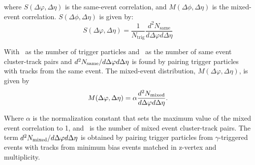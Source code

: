 
where $S(\Delta \varphi, \Delta \eta)$ is the same-event correlation, and $M(\Delta \phi, \Delta \eta)$ is the mixed-event correlation. $S(\Delta \phi, \Delta \eta)$ is given by: 
\begin{equation}
S(\Delta \varphi, \Delta \eta) = \frac{1}{N_{\mathrm{trig}}}\frac{d^2N_{\mathrm{same}}}{d\Delta \varphi d\Delta \eta}
\end{equation}

With \Ntrig~as the number of trigger particles and \Nsame~as the number of same event cluster-track pairs and $d^2N_{\mathrm{same}}/d\Delta \varphi d\Delta \eta$ is found by pairing trigger particles with tracks from the same event. The mixed-event distribution, $M(\Delta \varphi, \Delta \eta)$, is given by 
\begin{equation}
M(\Delta \varphi, \Delta \eta) = \alpha \frac{d^2 N_{\mathrm{mixed}}}{d\Delta \varphi d\Delta \eta}.
\end{equation}

Where $\alpha$ is the normalization constant that sets the maximum value of the mixed event correlation to 1, and \Nmixed~is the number of mixed event cluster-track pairs. The term $d^2 N_{\mathrm{mixed}}/d\Delta \varphi d\Delta \eta$ is obtained by pairing trigger particles from \(\gamma\)-triggered events with tracks from minimum bias events matched in z-vertex and multiplicity.


